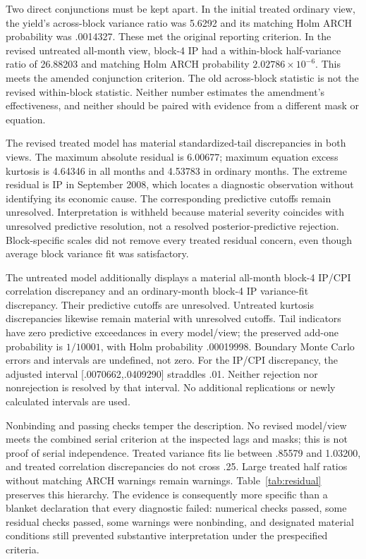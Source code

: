 \documentclass[11pt,a4paper]{article}
\begin{document}
Two direct conjunctions must be kept apart. In the initial treated ordinary view, the yield's across-block variance ratio was 5.6292 and its matching Holm ARCH probability was .0014327. These met the original reporting criterion. In the revised untreated all-month view, block-4 IP had a within-block half-variance ratio of 26.88203 and matching Holm ARCH probability $2.02786\times10^{-6}$. This meets the amended conjunction criterion. The old across-block statistic is not the revised within-block statistic. Neither number estimates the amendment's effectiveness, and neither should be paired with evidence from a different mask or equation.

The revised treated model has material standardized-tail discrepancies in both views. The maximum absolute residual is 6.00677; maximum equation excess kurtosis is 4.64346 in all months and 4.53783 in ordinary months. The extreme residual is IP in September 2008, which locates a diagnostic observation without identifying its economic cause. The corresponding predictive cutoffs remain unresolved. Interpretation is withheld because material severity coincides with unresolved predictive resolution, not a resolved posterior-predictive rejection. Block-specific scales did not remove every treated residual concern, even though average block variance fit was satisfactory.

The untreated model additionally displays a material all-month block-4 IP/CPI correlation discrepancy and an ordinary-month block-4 IP variance-fit discrepancy. Their predictive cutoffs are unresolved. Untreated kurtosis discrepancies likewise remain material with unresolved cutoffs. Tail indicators have zero predictive exceedances in every model/view; the preserved add-one probability is $1/10001$, with Holm probability .00019998. Boundary Monte Carlo errors and intervals are undefined, not zero. For the IP/CPI discrepancy, the adjusted interval [.0070662,.0409290] straddles .01. Neither rejection nor nonrejection is resolved by that interval. No additional replications or newly calculated intervals are used.

Nonbinding and passing checks temper the description. No revised model/view meets the combined serial criterion at the inspected lags and masks; this is not proof of serial independence. Treated variance fits lie between .85579 and 1.03200, and treated correlation discrepancies do not cross .25. Large treated half ratios without matching ARCH warnings remain warnings. Table~\ref{tab:residual} preserves this hierarchy. The evidence is consequently more specific than a blanket declaration that every diagnostic failed: numerical checks passed, some residual checks passed, some warnings were nonbinding, and designated material conditions still prevented substantive interpretation under the prespecified criteria.
\end{document}
